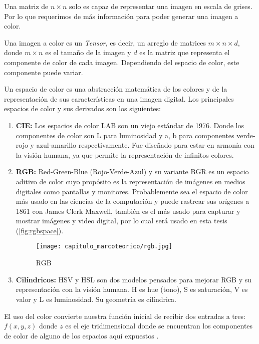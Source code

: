 Una matriz de \(n \times n\) solo es capaz de representar una imagen en escala
de grises. Por lo que requerimos de más información para poder generar una
imagen a color.

Una imagen a color es un \emph{Tensor}, es decir, un arreglo de matrices \(m
\times n \times d\), donde \(m \times n\) es el tamaño de la imagen y \(d\) es
la matriz que representa el componente de color de cada imagen. Dependiendo del
espacio de color, este componente puede variar.

Un espacio de color es una abstracción matemática de los colores y de la
representación de sus características en una imagen digital. Los principales
espacios de color y sus derivados son los siguientes:

\begin{enumerate}
    \item{\textbf{CIE:}} Los espacios de color LAB son un viejo estándar de
    1976. Donde los componentes de color son L para luminosidad y a, b para
    componentes verde-rojo y azul-amarillo respectivamente. Fue diseñado para
    estar en armonía con la visión humana, ya que permite la representación de
    infinitos colores.

    \item{\textbf{RGB:}} Red-Green-Blue (Rojo-Verde-Azul) y su variante BGR es
    un espacio aditivo de color cuyo propósito es la representación de imágenes
    en medios digitales como pantallas y monitores. Probablemente sea el espacio
    de color más usado en las ciencias de la computación y puede rastrear sus
    orígenes a 1861 con James Clerk Maxwell, también es el más usado para
    capturar y mostrar imágenes y video digital, por lo cual será usado en esta
    tesis (\autoref{fig:rgbspace}). 

    \begin{figure}[H]
        \centering
        \texttt{[image: capitulo\_marcoteorico/rgb.jpg]}
        \caption{RGB}\label{fig:rgbspace}
    \end{figure}

    \item{\textbf{Cilíndricos:}} HSV y HSL son dos modelos pensados para mejorar
    RGB y su representación con la visión humana. H es hue (tono), S es
    saturación, V es valor y L es luminosidad. Su geometría es cilíndrica.
\end{enumerate}

El uso del color convierte nuestra función inicial de recibir dos entradas a
tres: \(f(x,y,z)\) donde \(z\) es el eje tridimensional donde se encuentran los
componentes de color de alguno de los espacios aquí expuestos \cite{Vernon1991}.

